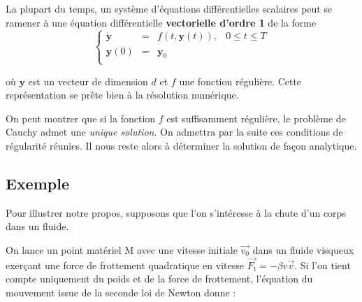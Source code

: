 La plupart du temps, un système d'équations différentielles scalaires peut se ramener à une équation différentielle \textbf{vectorielle d'ordre 1} de la forme 
\begin{equation}
\left\{
\begin{array}{cccc}
   \dot{ \mathbf{y}}  & = & f(t,\mathbf{y}(t)), & 0\leq t \leq T  \\
  \mathbf{y}(0) & = & \mathbf{y}_{0} & \\
\end{array}
\right.
\label{eq:ode}
\end{equation}

où $\mathbf{y}$ est un vecteur de dimension $d$ et $f$ une fonction régulière. Cette représentation se prête bien à la résolution numérique.

On peut montrer que si la fonction $f$ est suffisamment régulière, le problème de Cauchy admet une \emph{unique solution}. On admettra par la suite ces conditions de régularité réunies. Il nous reste alors à déterminer la solution de fa\c con analytique. 

\subsection{Exemple}
Pour illustrer notre propos, supposons que l'on s'intéresse à la chute d'un corps dans un fluide. 

On lance un point matériel M  avec une vitesse initiale $\overrightarrow{v_{0}}$ dans un fluide visqueux exer\c cant une force de frottement quadratique en vitesse $\overrightarrow{F_\text{t}}=-\beta v \overrightarrow{v}$. Si l'on tient compte uniquement du poids et de la force de frottement, l'équation du mouvement issue de la seconde loi de Newton donne :

